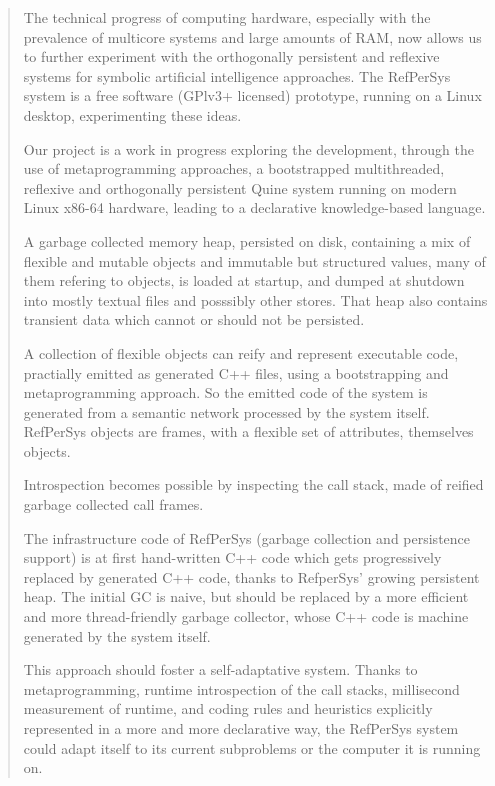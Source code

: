 \documentclass{IEEEtran}
\begin{document}
\begin{abstract}

  
The technical progress of computing hardware, especially with the
prevalence of multicore systems and large amounts of RAM, now allows
us to further experiment with the orthogonally persistent and
reflexive systems for symbolic artificial intelligence approaches.
The RefPerSys system is a free software (GPlv3+ licensed) prototype,
running on a Linux desktop, experimenting these ideas.

Our project is a work in progress exploring the development, through
the use of metaprogramming approaches, a bootstrapped multithreaded,
reflexive and orthogonally persistent Quine system running on modern
Linux x86-64 hardware, leading to a declarative knowledge-based
language.

A garbage collected memory heap, persisted on disk, containing a mix
of flexible and mutable objects and immutable but structured values,
many of them refering to objects, is loaded at startup, and dumped at
shutdown into mostly textual files and posssibly other stores. That
heap also contains transient data which cannot or should not be
persisted.

A collection of flexible objects can reify and represent executable
code, practially emitted as generated C++ files, using a bootstrapping
and metaprogramming approach. So the emitted code of the system is
generated from a semantic network processed by the system
itself. RefPerSys objects are frames, with a flexible set of
attributes, themselves objects.

Introspection becomes possible by inspecting the call stack, made of
reified garbage collected call frames.

The infrastructure code of RefPerSys (garbage collection and
persistence support) is at first hand-written C++ code which gets
progressively replaced by generated C++ code, thanks to RefperSys'
growing persistent heap. The initial GC is naive, but should be
replaced by a more efficient and more thread-friendly garbage
collector, whose C++ code is machine generated by the system itself.

This approach should foster a self-adaptative system. Thanks to
metaprogramming, runtime introspection of the call stacks, millisecond
measurement of runtime, and coding rules and heuristics explicitly
represented in a more and more declarative way, the RefPerSys system
could adapt itself to its current subproblems or the computer it is
running on.

\end{abstract}
\end{document}
